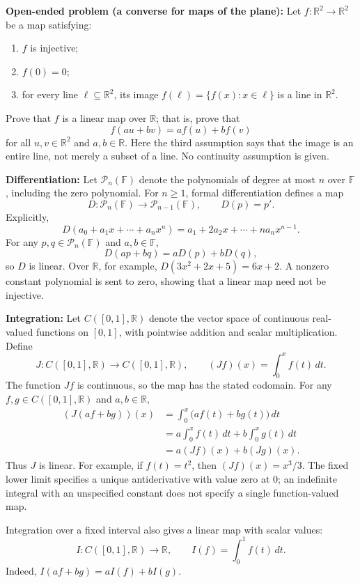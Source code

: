 \documentclass[a4paper,11pt,abstract=true]{scrartcl}
\theoremstyle{dotlessP}
\theoremstyle{dotlessS}
\theoremstyle{remark}
\theoremstyle{definition}
\begin{document}
\begin{problem_box}
\textbf{Open-ended problem (a converse for maps of the plane):} Let
$f:\mathbb{R}^2\longrightarrow\mathbb{R}^2$ be a map satisfying:
\begin{enumerate}
    \item $f$ is injective;
    \item $f(0)=0$;
    \item for every line $\ell\subseteq\mathbb{R}^2$, its image
    $f(\ell)=\{f(x):x\in\ell\}$ is a line in $\mathbb{R}^2$.
\end{enumerate}
Prove that $f$ is a linear map over $\mathbb{R}$; that is, prove that
\[
f(au+bv)=af(u)+bf(v)
\]
for all $u,v\in\mathbb{R}^2$ and $a,b\in\mathbb{R}$.
Here the third assumption says that the image is an entire line, not merely
a subset of a line. No continuity assumption is given.
\end{problem_box}

\begin{claim_box}
\textbf{Differentiation:} Let $\mathcal{P}_n(\mathbb{F})$
denote the polynomials of degree at most $n$ over $\mathbb{F}$, including
the zero polynomial. For $n\geq1$, formal differentiation defines a map
\[
D:\mathcal{P}_n(\mathbb{F})\longrightarrow\mathcal{P}_{n-1}(\mathbb{F}),
\qquad D(p)=p'.
\]
Explicitly,
\[
D(a_0+a_1x+\cdots+a_n x^n)
=a_1+2a_2x+\cdots+na_n x^{n-1}.
\]
For any $p,q\in\mathcal{P}_n(\mathbb{F})$ and $a,b\in\mathbb{F}$,
\[
D(ap+bq)=aD(p)+bD(q),
\]
so $D$ is linear. Over $\mathbb{R}$, for example,
$D(3x^2+2x+5)=6x+2$. A nonzero constant polynomial is sent to zero,
showing that a linear map need not be injective.
\end{claim_box}

\begin{claim_box}
\textbf{Integration:} Let $C([0,1],\mathbb{R})$ denote
the vector space of continuous real-valued functions on $[0,1]$, with
pointwise addition and scalar multiplication. Define
\[
J:C([0,1],\mathbb{R})\longrightarrow C([0,1],\mathbb{R}),
\qquad (Jf)(x)=\int_0^x f(t)\,dt.
\]
The function $Jf$ is continuous, so the map has the stated codomain.
For any $f,g\in C([0,1],\mathbb{R})$ and $a,b\in\mathbb{R}$,
\[
\begin{aligned}
(J(af+bg))(x)
&=\int_0^x \bigl(af(t)+bg(t)\bigr)\,dt\\
&=a\int_0^x f(t)\,dt+b\int_0^x g(t)\,dt\\
&=a(Jf)(x)+b(Jg)(x).
\end{aligned}
\]
Thus $J$ is linear. For example, if $f(t)=t^2$, then $(Jf)(x)=x^3/3$.
The fixed lower limit specifies a unique antiderivative with value zero
at $0$; an indefinite integral with an unspecified constant does not
specify a single function-valued map.

Integration over a fixed interval also gives a linear map with scalar
values:
\[
I:C([0,1],\mathbb{R})\longrightarrow\mathbb{R},
\qquad I(f)=\int_0^1 f(t)\,dt.
\]
Indeed, $I(af+bg)=aI(f)+bI(g)$.
\end{claim_box}
\end{document}
